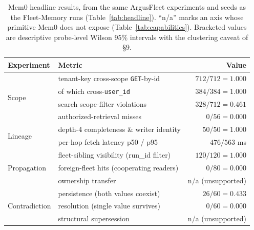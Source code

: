 \begin{table}[t]
\centering
\small
\caption{Mem0 headline results, from the same ArgusFleet experiments and
seeds as the Fleet-Memory runs (Table~\ref{tab:headline}).
``n/a'' marks an axis whose primitive Mem0 does not expose
(Table~\ref{tab:capabilities}). Bracketed values are descriptive
probe-level Wilson 95\% intervals with the clustering caveat of \S9.}
\label{tab:mem0}
\begin{tabular}{llr}
\toprule
Experiment & Metric & Value \\
\midrule
\multirow{4}{*}{Scope}
 & tenant-key cross-scope \texttt{GET}-by-id & $712/712 = 1.000$ \\
 & \quad of which cross-\texttt{user\_id} & $384/384 = 1.000$ \\
 & search scope-filter violations & $328/712 = 0.461$ \\
 & authorized-retrieval misses & $0/56 = 0.000$ \\
\midrule
\multirow{2}{*}{Lineage}
 & depth-4 completeness \& writer identity & $50/50 = 1.000$ \\
 & per-hop fetch latency p50 / p95 & $476 / 563$ ms \\
\midrule
\multirow{3}{*}{Propagation}
 & fleet-sibling visibility (run\_id filter) & $120/120 = 1.000$ \\
 & foreign-fleet hits (cooperating readers) & $0/80 = 0.000$ \\
 & ownership transfer & n/a (unsupported) \\
\midrule
\multirow{3}{*}{Contradiction}
 & persistence (both values coexist) & $26/60 = 0.433$ \\
 & resolution (single value survives) & $0/60 = 0.000$ \\
 & structural supersession & n/a (unsupported) \\
\bottomrule
\end{tabular}
\end{table}
